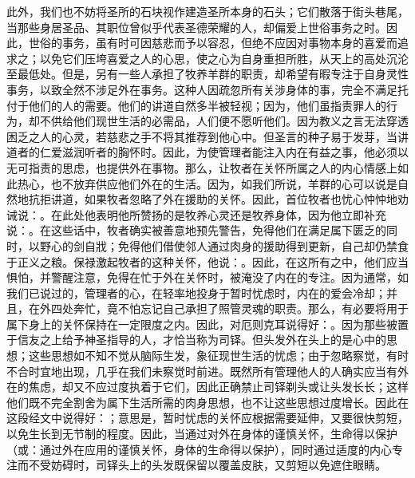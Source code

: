 此外，我们也不妨将圣所的石块视作建造圣所本身的石头；它们散落于街头巷尾，当那些身居圣品、其职位曾似乎代表圣德荣耀的人，却偏爱上世俗事务之时。因此，世俗的事务，虽有时可因慈悲而予以容忍，但绝不应因对事物本身的喜爱而追求之；以免它们压垮喜爱之人的心思，使之心为自身重担所胜，从天上的高处沉沦至最低处。但是，另有一些人承担了牧养羊群的职责，却希望有暇专注于自身灵性事务，以致全然不涉足外在事务。这种人因疏忽所有关涉身体的事，完全不满足托付于他们的人的需要。他们的讲道自然多半被轻视；因为，他们虽指责罪人的行为，却不供给他们现世生活的必需品，人们便不愿听他们。因为教义之言无法穿透困乏之人的心灵，若慈悲之手不将其推荐到他心中。但圣言的种子易于发芽，当讲道者的仁爱滋润听者的胸怀时。因此，为使管理者能注入内在有益之事，他必须以无可指责的思虑，也提供外在事物。那么，让牧者在关怀所属之人的内心情感上如此热心，也不放弃供应他们外在的生活。因为，如我们所说，羊群的心可以说是自然地抗拒讲道，如果牧者忽略了外在援助的关怀。因此，首位牧者也忧心忡忡地劝诫说：。在此处他表明他所赞扬的是牧养心灵还是牧养身体，因为他立即补充说：。在这些话中，牧者确实被善意地预先警告，免得他们在满足属下匮乏的同时，以野心的剑自戕；免得他们借使邻人通过肉身的援助得到更新，自己却仍禁食于正义之粮。保禄激起牧者的这种关怀，他说：。因此，在这所有之中，他们应当惧怕，并警醒注意，免得在忙于外在关怀时，被淹没了内在的专注。因为通常，如我们已说过的，管理者的心，在轻率地投身于暂时忧虑时，内在的爱会冷却；并且，在外四处奔忙，竟不怕忘记自己承担了照管灵魂的职责。那么，有必要将用于属下身上的关怀保持在一定限度之内。因此，对厄则克耳说得好：。因为那些被置于信友之上给予神圣指导的人，才恰当称为司铎。但头发外在头上的是心中的思想；这些思想如不知不觉从脑际生发，象征现世生活的忧虑；由于忽略察觉，有时不合时宜地出现，几乎在我们未察觉时前进。既然所有管理他人的人确实应当有外在的焦虑，却又不应过度执着于它们，因此正确禁止司铎剃头或让头发长长；这样他们既不完全割舍为属下生活所需的肉身思想，也不让这些思想过度增长。因此在这段经文中说得好：；意思是，暂时忧虑的关怀应根据需要延伸，又要很快剪短，以免生长到无节制的程度。因此，当通过对外在身体的谨慎关怀，生命得以保护（或：通过外在应用的谨慎关怀，身体的生命得以保护），同时通过适度的内心专注而不受妨碍时，司铎头上的头发既保留以覆盖皮肤，又剪短以免遮住眼睛。\par

